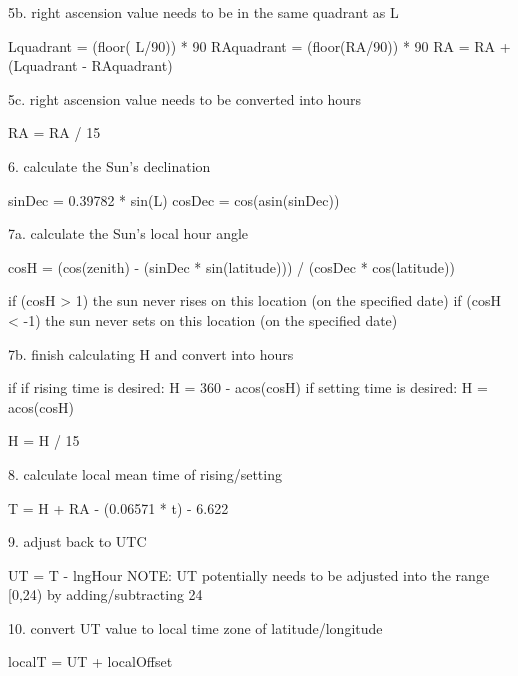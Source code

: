 5b. right ascension value needs to be in the same quadrant as L

	Lquadrant  = (floor( L/90)) * 90
	RAquadrant = (floor(RA/90)) * 90
	RA = RA + (Lquadrant - RAquadrant)

5c. right ascension value needs to be converted into hours

	RA = RA / 15

6. calculate the Sun's declination

	sinDec = 0.39782 * sin(L)
	cosDec = cos(asin(sinDec))

7a. calculate the Sun's local hour angle
	
	cosH = (cos(zenith) - (sinDec * sin(latitude))) / (cosDec * cos(latitude))
	
	if (cosH >  1) 
	  the sun never rises on this location (on the specified date)
	if (cosH < -1)
	  the sun never sets on this location (on the specified date)

7b. finish calculating H and convert into hours
	
	if if rising time is desired:
	  H = 360 - acos(cosH)
	if setting time is desired:
	  H = acos(cosH)
	
	H = H / 15

8. calculate local mean time of rising/setting
	
	T = H + RA - (0.06571 * t) - 6.622

9. adjust back to UTC
	
	UT = T - lngHour
	NOTE: UT potentially needs to be adjusted into the range [0,24) by adding/subtracting 24

10. convert UT value to local time zone of latitude/longitude
	
	localT = UT + localOffset


